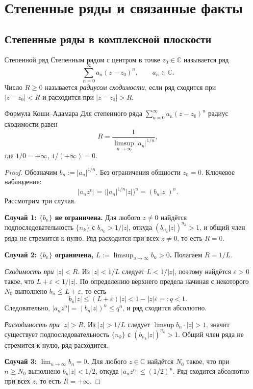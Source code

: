 
\section{Степенные ряды и связанные факты}

\subsection{Степенные ряды в комплексной плоскости}

\begin{Definition}{Степенной ряд}{}
	Степенным рядом с центром в точке $z_0 \in \mathbb C$ называется ряд
	\[
	\sum_{n=0}^{\infty} a_n (z-z_0)^n,\qquad a_n \in \mathbb C.
	\]
	Число $R \ge 0$ называется \emph{радиусом сходимости}, если ряд сходится при $|z-z_0|<R$ и расходится при $|z-z_0|>R$.
\end{Definition}

\begin{Theorem}{Формула Коши--Адамара}{}
	Для степенного ряда $\sum_{n=0}^{\infty} a_n (z-z_0)^n$ радиус сходимости равен
	\[
	R = \frac{1}{\limsup\limits_{n\to\infty}|a_n|^{1/n}},
	\]
	где $1/0=+\infty$, $1/(+\infty)=0$.
\end{Theorem}

\begin{proof}
	Обозначим $b_n:=|a_n|^{1/n}$. Без ограничения общности $z_0=0$.
	Ключевое наблюдение:
	\[
	|a_n z^n| = \bigl(|a_n|^{1/n}|z|\bigr)^n = (b_n|z|)^n.
	\]
	Рассмотрим три случая.
	
	\textbf{Случай 1: $\{b_n\}$ не ограничена.}
	Для любого $z\ne0$ найдётся подпоследовательность $\{n_k\}$ с $b_{n_k}>1/|z|$,
	откуда $(b_{n_k}|z|)^{n_k}>1$, и общий член ряда не стремится к нулю.
	Ряд расходится при всех $z\ne0$, то есть $R=0$.
	
	\textbf{Случай 2: $\{b_n\}$ ограничена, $L:=\limsup_{n\to\infty}b_n>0$.}
	Полагаем $R=1/L$.
	
	\emph{Сходимость при $|z|<R$.} Из $|z|<1/L$ следует $L<1/|z|$, поэтому найдётся
	$\varepsilon>0$ такое, что $L+\varepsilon<1/|z|$. По определению верхнего предела
	начиная с некоторого $N_0$ выполнено $b_n\le L+\varepsilon$, то есть
	\[
	b_n|z| \le (L+\varepsilon)|z| < 1-|z|\varepsilon =: q < 1.
	\]
	Следовательно, $|a_nz^n|=(b_n|z|)^n\le q^n$, и ряд сходится абсолютно.
	
	\emph{Расходимость при $|z|>R$.} Из $|z|>1/L$ следует $\limsup b_n\cdot|z|>1$,
	значит существует подпоследовательность $\{n_k\}$ с $(b_{n_k}|z|)^{n_k}>1$.
	Общий член ряда не стремится к нулю, ряд расходится.
	
	\textbf{Случай 3: $\lim_{n\to\infty}b_n=0$.}
	Для любого $z\in\mathbb C$ найдётся $N_0$ такое, что при $n\ge N_0$
	выполнено $b_n|z|<1/2$, откуда $|a_nz^n|\le(1/2)^n$.
	Ряд сходится абсолютно при всех $z$, то есть $R=+\infty$.
\end{proof}

